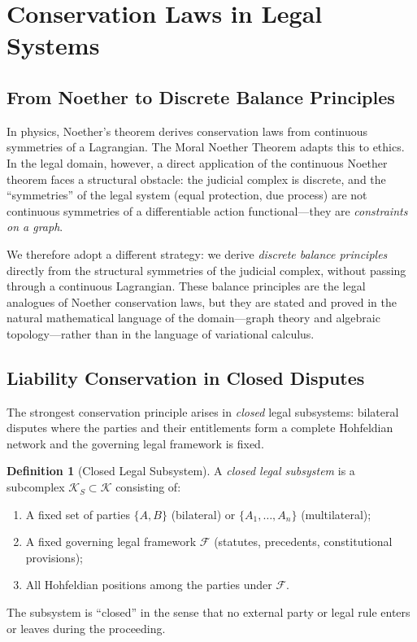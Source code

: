 \documentclass[12pt]{article}
\theoremstyle{definition}
\newtheorem{definition}[theorem]{Definition}
\theoremstyle{remark}
\begin{document}
\section{Conservation Laws in Legal Systems}
\label{sec:noether}

\subsection{From Noether to Discrete Balance Principles}

In physics, Noether's theorem \cite{noether1918} derives conservation laws from continuous symmetries of a Lagrangian.  The Moral Noether Theorem \cite{anon2025b} adapts this to ethics.  In the legal domain, however, a direct application of the continuous Noether theorem faces a structural obstacle: the judicial complex is discrete, and the ``symmetries'' of the legal system (equal protection, due process) are not continuous symmetries of a differentiable action functional---they are \emph{constraints on a graph}.

We therefore adopt a different strategy: we derive \emph{discrete balance principles} directly from the structural symmetries of the judicial complex, without passing through a continuous Lagrangian.  These balance principles are the legal analogues of Noether conservation laws, but they are stated and proved in the natural mathematical language of the domain---graph theory and algebraic topology---rather than in the language of variational calculus.

\subsection{Liability Conservation in Closed Disputes}

The strongest conservation principle arises in \emph{closed} legal subsystems: bilateral disputes where the parties and their entitlements form a complete Hohfeldian network and the governing legal framework is fixed.

\begin{definition}[Closed Legal Subsystem]
\label{def:closed}
A \emph{closed legal subsystem} is a subcomplex $\mathcal{K}_S \subset \mathcal{K}$ consisting of:
\begin{enumerate}
    \item A fixed set of parties $\{A, B\}$ (bilateral) or $\{A_1, \ldots, A_n\}$ (multilateral);
    \item A fixed governing legal framework $\mathcal{F}$ (statutes, precedents, constitutional provisions);
    \item All Hohfeldian positions among the parties under $\mathcal{F}$.
\end{enumerate}
The subsystem is ``closed'' in the sense that no external party or legal rule enters or leaves during the proceeding.
\end{definition}
\end{document}
